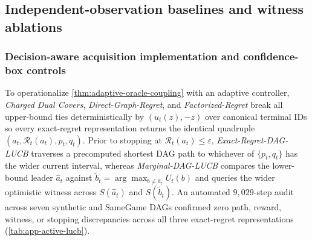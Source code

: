 \documentclass{article}
\theoremstyle{plain}
\theoremstyle{definition}
\begin{document}
\subsection{Independent-observation baselines and witness ablations}
\label{app:v3-strengthening}

\subsubsection{Decision-aware acquisition implementation and confidence-box controls}
\label{sec:strengthening-experiments}

To operationalize \cref{thm:adaptive-oracle-coupling} with an adaptive controller, \emph{Charged Dual Covers}, \emph{Direct-Graph-Regret}, and \emph{Factorized-Regret} break all upper-bound ties deterministically by $(u_t(z),-z)$ over canonical terminal IDs so every exact-regret representation returns the identical quadruple $(a_t,\mathcal R_t(a_t),p_t,q_t)$. Prior to stopping at $\mathcal R_t(a_t)\le\varepsilon$, \emph{Exact-Regret-DAG-LUCB} traverses a precomputed shortest DAG path to whichever of $\{p_t,q_t\}$ has the wider current interval, whereas \emph{Marginal-DAG-LUCB} compares the lower-bound leader $\hat a_t$ against $\tilde b_t=\arg\max_{b\ne \hat a_t}U_t(b)$ and queries the wider optimistic witness across $S(\hat a_t)$ and $S(\tilde b_t)$. An automated $9{,}029$-step audit across seven synthetic and SameGame DAGs confirmed zero path, reward, witness, or stopping discrepancies across all three exact-regret representations (\cref{tab:app-active-lucb}).
\end{document}
